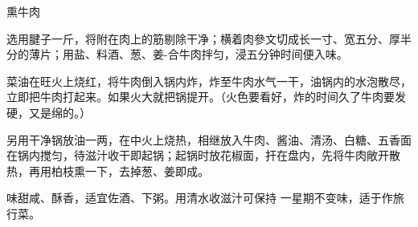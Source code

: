 \begin{recipe}{熏牛肉}

\ingredients



\cooking

\step 选用腱子一斤，将附在肉上的筋剔除干净；横着肉參文切成长一寸、宽五分、厚半分的薄片；用盐、料酒、葱、姜-合牛肉拌匀，浸五分钟时间便入味。

\step 菜油在旺火上烧红，将牛肉倒入锅内炸，炸至牛肉水气一干，油锅内的水泡散尽，立即把牛肉打起来。如果火大就把锅提开。（火色要看好，炸的时间久了牛肉要发硬，又是绵的。）

\step 另用干净锅放油一两，在中火上烧热，相继放入牛肉、酱油、清汤、白糖、五香面在锅内搅匀，待滋汁收干即起锅；起锅时放花椒面，扞在盘内，先将牛肉敞开散热，再用柏枝熏一下，去掉葱、姜即成。

\notes

味甜咸、酥香，适宜佐酒、下粥。用清水收滋汁可保持 一星期不变味，适于作旅行菜。

\end{recipe}

